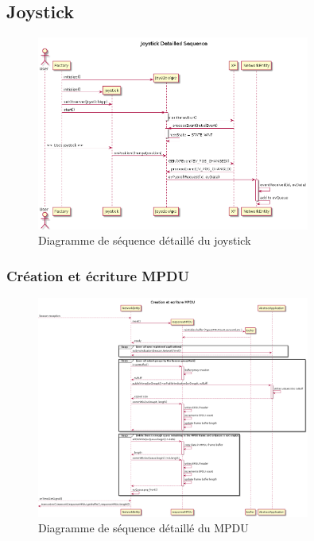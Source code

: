 \documentclass{report}
\begin{document}
\subsection{Joystick}
\begin{figure}[H]
    \centering
    \includegraphics[width= 0.8\textwidth]{Images/JoystickSequence.png}
    \caption{Diagramme de séquence détaillé du joystick}
    \label{fig:JoystickSequence}
\end{figure}
\subsubsection{Création et écriture MPDU}
\begin{figure}[H]
    \centering
    \includegraphics[width= 0.8\textwidth]{Images/multipdu.png}
    \caption{Diagramme de séquence détaillé du MPDU}
    \label{fig:MPDUSequenceDetailled}
\end{figure}
\end{document}
